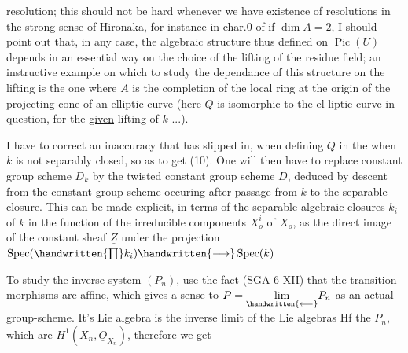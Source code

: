  resolution; this should not be hard whenever we have existence of resolutions in the strong sense of Hironaka, for instance in char.$0$ of if $\dim A=2$,  I should point out that, in any case, the algebraic structure thus defined on $\operatorname{Pic}(U)$ depends in an essential way on the choice of the lifting of the residue field; an instructive example on which to study the dependance of this structure on the lifting is the one where $A$ is the completion of the local ring at the origin of the projecting cone of an elliptic curve (here $Q$ is isomorphic to the el liptic curve in question, for the \uline{given} lifting of $k$ ...).

I have to correct an inaccuracy that has slipped in, when defining $Q$ in the  when $k$ is not separably closed, so as to get (10). One will then have to replace  constant group scheme $D_k$ by the twisted constant group scheme $\underline{D}$, deduced by descent from the constant group-scheme occuring after passage from $k$ to the separable closure.  This can be made explicit, in terms of the separable algebraic closures  $k_i$ of $k$ in the function  of the irreducible components $X_o^i$ of $X_o$, as the  direct image of the constant sheaf $\underline{Z}$ under the projection $\operatorname{Spec}(\handwritten{\prod}k_i)\handwritten{\longrightarrow}\operatorname{Spec}(k)$

To study the inverse system $(P_n)$, use the fact (SGA 6 XII) that the transition morphisms are affine, which gives a sense to $P=\underset{\handwritten{\longleftarrow}}{\lim}P_n$ as an actual group-scheme. It's Lie algebra is the inverse limit of the Lie algebras Hf the $P_n$, which are $H^1(X_n,\underline{O}_{X_n})$, therefore we get
